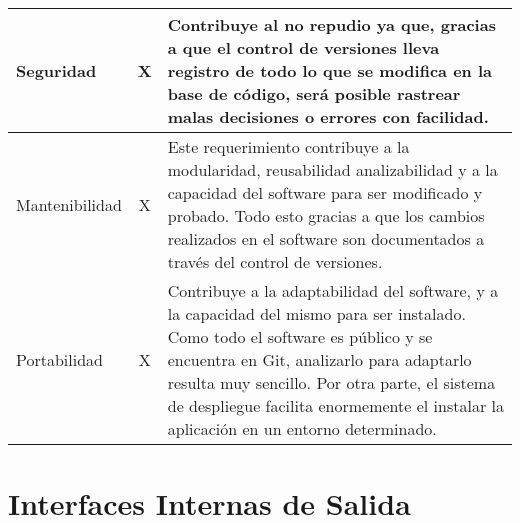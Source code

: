 \begin{center}
\begin{tabular}{ | p{2cm}| p{8cm} | p{5cm} |}
    \multicolumn{1}{|p{3.5cm}|}{\nohyphens{Seguridad}} & \multicolumn{1}{|c|}{X} & \multicolumn{1}{|p{10cm}|}{Contribuye al no repudio ya que, gracias a que el control de versiones lleva registro de todo lo que se modifica en la base de código, será posible rastrear malas decisiones o errores con facilidad.} \\ \hline
    
    \multicolumn{1}{|p{3.5cm}|}{\nohyphens{Mantenibilidad}} & \multicolumn{1}{|c|}{X} & \multicolumn{1}{|p{10cm}|}{Este requerimiento contribuye a la modularidad, reusabilidad analizabilidad y a la capacidad del software para ser modificado y probado. Todo esto gracias a que los cambios realizados en el software son documentados a través del control de versiones.} \\ \hline
    
    \multicolumn{1}{|p{3.5cm}|}{\nohyphens{Portabilidad}} & \multicolumn{1}{|c|}{X} & \multicolumn{1}{|p{10cm}|}{Contribuye a la adaptabilidad del software, y a la capacidad del mismo para ser instalado. Como todo el software es público y se encuentra en Git, analizarlo para adaptarlo resulta muy sencillo. Por otra parte, el sistema de despliegue facilita enormemente el instalar la aplicación en un entorno determinado.} \\
    \hline
  \end{tabular}
  
  \label{table:rnf:vcs}
\end{center}

\section{Interfaces Internas de Salida}


